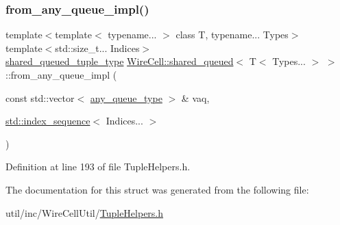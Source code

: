 \subsubsection{\texorpdfstring{from\+\_\+any\+\_\+queue\+\_\+impl()}{from\_any\_queue\_impl()}}
{\footnotesize\ttfamily template$<$template$<$ typename... $>$ class T, typename... Types$>$ \\
template$<$std\+::size\+\_\+t... Indices$>$ \\
\hyperlink{struct_wire_cell_1_1shared__queued_3_01_t_3_01_types_8_8_8_01_4_01_4_ab8420ec9cbc02f0d73f0e7521a063cb0}{shared\+\_\+queued\+\_\+tuple\+\_\+type} \hyperlink{struct_wire_cell_1_1shared__queued}{Wire\+Cell\+::shared\+\_\+queued}$<$ T$<$ Types... $>$ $>$\+::from\+\_\+any\+\_\+queue\+\_\+impl (\begin{DoxyParamCaption}\item[{const std\+::vector$<$ \hyperlink{struct_wire_cell_1_1shared__queued_3_01_t_3_01_types_8_8_8_01_4_01_4_a8ff8e1f0ff23fd750a91eeb2d4952bb0}{any\+\_\+queue\+\_\+type} $>$ \&}]{vaq,  }\item[{\hyperlink{structstd_1_1index__sequence}{std\+::index\+\_\+sequence}$<$ Indices... $>$}]{ }\end{DoxyParamCaption})\hspace{0.3cm}{\ttfamily [inline]}}



Definition at line 193 of file Tuple\+Helpers.\+h.



The documentation for this struct was generated from the following file\+:\begin{DoxyCompactItemize}
\item 
util/inc/\+Wire\+Cell\+Util/\hyperlink{_tuple_helpers_8h}{Tuple\+Helpers.\+h}\end{DoxyCompactItemize}
